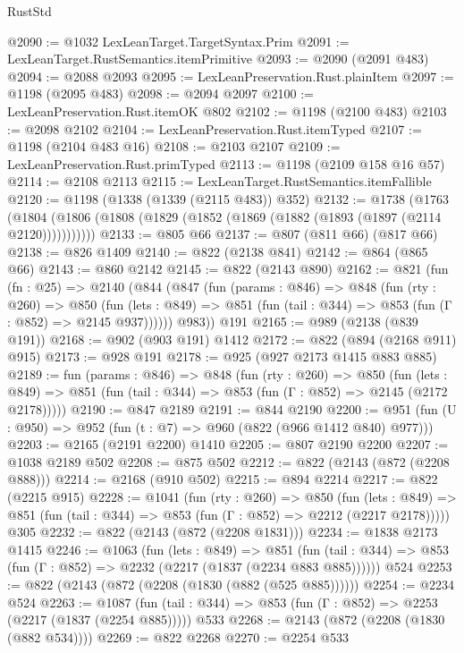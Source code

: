 \begin{lexlean}{RustStd}
\begin{coremodule}
{\begin{coremodule}
{{{{{{{{{@2090 := @1032 LexLeanTarget.TargetSyntax.Prim
@2091 := LexLeanTarget.RustSemantics.itemPrimitive
@2093 := @2090 (@2091 @483)
@2094 := @2088 @2093
@2095 := LexLeanPreservation.Rust.plainItem
@2097 := @1198 (@2095 @483)
@2098 := @2094 @2097
@2100 := LexLeanPreservation.Rust.itemOK @802
@2102 := @1198 (@2100 @483)
@2103 := @2098 @2102
@2104 := LexLeanPreservation.Rust.itemTyped
@2107 := @1198 (@2104 @483 @16)
@2108 := @2103 @2107
@2109 := LexLeanPreservation.Rust.primTyped
@2113 := @1198 (@2109 @158 @16 @57)
@2114 := @2108 @2113
@2115 := LexLeanTarget.RustSemantics.itemFallible
@2120 := @1198 (@1338 (@1339 (@2115 @483)) @352)
@2132 := @1738
    (@1763 (@1804 (@1806 (@1808 (@1829 (@1852 (@1869 (@1882 (@1893 (@1897 (@2114 @2120)))))))))))
@2133 := @805 @66
@2137 := @807 (@811 @66) (@817 @66)
@2138 := @826 @1409
@2140 := @822 (@2138 @841)
@2142 := @864 (@865 @66)
@2143 := @860 @2142
@2145 := @822 (@2143 @890)
@2162 := @821
    (fun (fn : @25) =>
    @2140
      (@844
        (@847
          (fun (params : @846) =>
          @848
            (fun (rty : @260) =>
            @850
              (fun (lets : @849) =>
              @851 (fun (tail : @344) => @853 (fun (Γ : @852) => @2145 @937))))))
        @983))
    @191
@2165 := @989 (@2138 (@839 @191))
@2168 := @902 (@903 @191) @1412
@2172 := @822 (@894 (@2168 @911) @915)
@2173 := @928 @191
@2178 := @925 (@927 @2173 @1415 @883 @885)
@2189 := fun (params : @846) =>
  @848
    (fun (rty : @260) =>
    @850
      (fun (lets : @849) =>
      @851 (fun (tail : @344) => @853 (fun (Γ : @852) => @2145 (@2172 @2178)))))
@2190 := @847 @2189
@2191 := @844 @2190
@2200 := @951 (fun (U : @950) => @952 (fun (t : @7) => @960 (@822 (@966 @1412 @840) @977)))
@2203 := @2165 (@2191 @2200) @1410
@2205 := @807 @2190 @2200
@2207 := @1038 @2189 @502
@2208 := @875 @502
@2212 := @822 (@2143 (@872 (@2208 @888)))
@2214 := @2168 (@910 @502)
@2215 := @894 @2214
@2217 := @822 (@2215 @915)
@2228 := @1041
    (fun (rty : @260) =>
    @850
      (fun (lets : @849) =>
      @851 (fun (tail : @344) => @853 (fun (Γ : @852) => @2212 (@2217 @2178)))))
    @305
@2232 := @822 (@2143 (@872 (@2208 @1831)))
@2234 := @1838 @2173 @1415
@2246 := @1063
    (fun (lets : @849) =>
    @851 (fun (tail : @344) => @853 (fun (Γ : @852) => @2232 (@2217 (@1837 (@2234 @883 @885))))))
    @524
@2253 := @822 (@2143 (@872 (@2208 (@1830 (@882 (@525 @885))))))
@2254 := @2234 @524
@2263 := @1087
    (fun (tail : @344) => @853 (fun (Γ : @852) => @2253 (@2217 (@1837 (@2254 @885)))))
    @533
@2268 := @2143 (@872 (@2208 (@1830 (@882 @534))))
@2269 := @822 @2268
@2270 := @2254 @533
}}}}}}}}}
\end{coremodule}}
\end{coremodule}
\end{lexlean}
